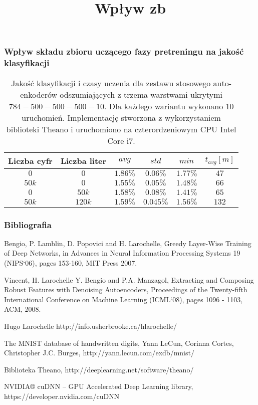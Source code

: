 \documentclass{beamer}
\begin{document}
\begin{frame}
\frametitle{Wpływ składu zbioru uczącego fazy pretreningu na jakość klasyfikacji}

\begin {table}
\title{Wpływ zb}
\begin{center}
\begin{tabular}{cc|ccc|c}
    \hline
    Liczba cyfr & Liczba liter    & $avg$     & $std$     & $min$      & $t_{avg}[m]$   \\
    \hline
    $0$ &    $0$           & $1.86\%$  & $0.06\%$  & $1.77\%$  &      $47$                    \\
    $50k$ & $0$            & $1.55\%$  & $0.05\%$  & $1.48\%$  &      $66$              \\
    $0$   & $50k$            & $1.58\%$  & $0.08\%$  & $1.41\%$  &      $65$             \\
    $50k$ & $120k$           & $1.59\%$  & $0.045\%$ & $1.56\%$  &    $132$  \\

\end{tabular}
\caption {Jakość klasyfikacji i czasy uczenia dla zestawu stosowego auto-enkoderów odszumiających z trzema warstwami ukrytymi $784 -500-500-500- 10$. Dla każdego wariantu wykonano 10 uruchomień. Implementację stworzona z wykorzystaniem biblioteki Theano i uruchomiono na czterordzeniowym CPU Intel Core i7.}
\label{table:5}
\end{center}
\end {table}

\end{frame}








\begin{frame}
\frametitle{Bibliografia}


\begin{thebibliography}{99}
 Bengio, P. Lamblin, D. Popovici and H. Larochelle, Greedy Layer-Wise Training of Deep Networks, in Advances in Neural Information Processing Systems 19 (NIPS‘06), pages 153-160, MIT Press 2007.

 Vincent, H. Larochelle Y. Bengio and P.A. Manzagol, Extracting and Composing Robust Features with Denoising Autoencoders, Proceedings of the Twenty-fifth International Conference on Machine Learning (ICML‘08), pages 1096 - 1103, ACM, 2008.

 Hugo Larochelle http://info.usherbrooke.ca/hlarochelle/

 The MNIST database of handwritten digits, Yann LeCun, Corinna Cortes, Christopher J.C. Burges, http://yann.lecun.com/exdb/mnist/

 Biblioteka Theano, http://deeplearning.net/software/theano/

 NVIDIA® cuDNN – GPU Accelerated Deep Learning library, https://developer.nvidia.com/cuDNN
\end{thebibliography}


\end{frame}


\end{document}

